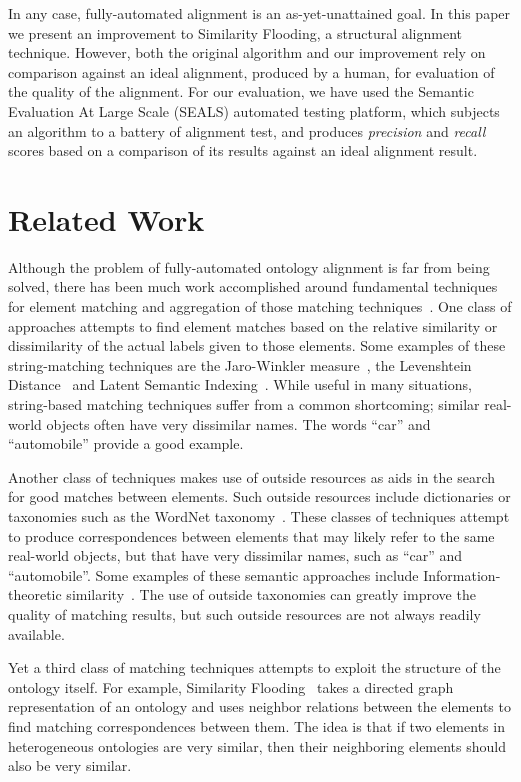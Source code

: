 \documentclass[letterpaper,twocolumn,12pt]{article}
\begin{document}
In any case, fully-automated alignment is an as-yet-unattained goal. 
In this paper we present an improvement to Similarity Flooding, a structural alignment technique. 
However, both the original algorithm and our improvement rely on comparison against an ideal alignment, produced by a human, for evaluation of the quality of the alignment. 
For our evaluation, we have used the Semantic Evaluation At Large Scale (SEALS) automated testing platform, which subjects an algorithm to a battery of alignment test, and produces \textit{precision} and \textit{recall} scores based on a comparison of its results against an ideal alignment result.

\section{Related Work}

Although the problem of fully-automated ontology alignment is far from being solved, there has been much work accomplished around fundamental techniques for element matching and aggregation of those matching techniques~\cite{euzenat:2007:ontology}.
One class of approaches attempts to find element matches based on the relative similarity or dissimilarity of the actual labels given to those elements. 
Some examples of these string-matching techniques are the Jaro-Winkler measure~\cite{winkler:1999:state}, the Levenshtein Distance~\cite{yujian:2007:levenshtein} and Latent Semantic Indexing~\cite{benzecri:1973:lsi}.
%
While useful in many situations, string-based matching techniques suffer from a common shortcoming; similar real-world objects often have very dissimilar names. 
The words ``car'' and ``automobile'' provide a good example.

Another class of techniques makes use of outside resources as aids in the search for good matches between elements. 
Such outside resources include dictionaries or taxonomies such as the WordNet taxonomy~\cite{miller:1995:wordnet}. 
These classes of techniques attempt to produce correspondences between elements that may likely refer to the same real-world objects, but that have very dissimilar names, such as ``car'' and ``automobile''. 
Some examples of these semantic approaches include Information-theoretic similarity~\cite{lin:1998:information}.
%
The use of outside taxonomies can greatly improve the quality of matching results, but such outside resources are not always readily available.

Yet a third class of matching techniques attempts to exploit the structure of the ontology itself. 
For example, Similarity Flooding~\cite{melnik:2002:similarity} takes a directed graph representation of an ontology and uses neighbor relations between the elements to find matching correspondences between them. 
The idea is that if two elements in heterogeneous ontologies are very similar, then their neighboring elements should also be very similar.
\end{document}
